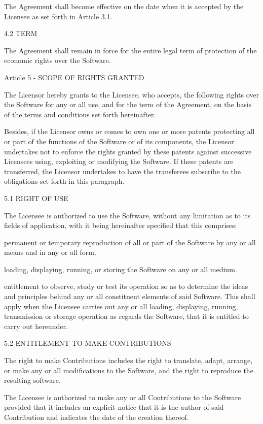 \documentclass[oneside,english,onecolumn,letterpaper]{book}
\begin{document}
The Agreement shall become effective on the date when it is accepted by the Licensee as set forth in Article 3.1.

4.2 TERM

The Agreement shall remain in force for the entire legal term of protection of the economic rights over the Software.

Article 5 - SCOPE OF RIGHTS GRANTED

The Licensor hereby grants to the Licensee, who accepts, the following rights over the Software for any or all use, and for the term of the Agreement, on the basis of the terms and conditions set forth hereinafter.

Besides, if the Licensor owns or comes to own one or more patents protecting all or part of the functions of the Software or of its components, the Licensor undertakes not to enforce the rights granted by these patents against successive Licensees using, exploiting or modifying the Software. If these patents are transferred, the Licensor undertakes to have the transferees subscribe to the obligations set forth in this paragraph.

5.1 RIGHT OF USE

The Licensee is authorized to use the Software, without any limitation as to its fields of application, with it being hereinafter specified that this comprises:

permanent or temporary reproduction of all or part of the Software by any or all means and in any or all form.

loading, displaying, running, or storing the Software on any or all medium.

entitlement to observe, study or test its operation so as to determine the ideas and principles behind any or all constituent elements of said Software. This shall apply when the Licensee carries out any or all loading, displaying, running, transmission or storage operation as regards the Software, that it is entitled to carry out hereunder.

5.2 ENTITLEMENT TO MAKE CONTRIBUTIONS

The right to make Contributions includes the right to translate, adapt, arrange, or make any or all modifications to the Software, and the right to reproduce the resulting software.

The Licensee is authorized to make any or all Contributions to the Software provided that it includes an explicit notice that it is the author of said Contribution and indicates the date of the creation thereof.
\end{document}
